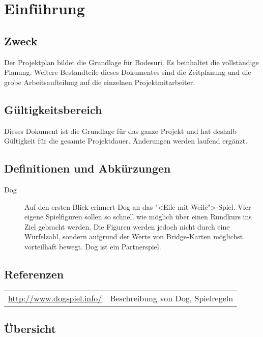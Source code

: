 \documentclass[12pt,halfparskip]{scrartcl}
\begin{document}


\section{Einführung}

\subsection{Zweck}

Der Projektplan bildet die Grundlage für Bodesuri. Es beinhaltet die vollständige Planung. Weitere Bestandteile dieses Dokumentes sind die Zeitplanung und die grobe Arbeitsaufteilung auf die einzelnen Projektmitarbeiter.

\subsection{Gültigkeitsbereich}

Dieses Dokument ist die Grundlage für das ganze Projekt und hat deshalb Gültigkeit für die gesamte Projektdauer. Änderungen werden laufend ergänzt.

\subsection{Definitionen und Abkürzungen}

\begin{description}
	\item[Dog] Auf den ersten Blick erinnert Dog an das "<Eile mit Weile">-Spiel. Vier eigene Spielfiguren sollen so schnell wie möglich über einen Rundkurs ins Ziel gebracht werden. Die Figuren werden jedoch nicht durch eine Würfelzahl, sondern aufgrund der Werte von Bridge-Karten möglichst vorteilhaft bewegt. Dog ist ein Partnerspiel.
\end{description}

\subsection{Referenzen}

\begin{tabular}{@{}ll@{}}
\url{http://www.dogspiel.info/} & Beschreibung von Dog, Spielregeln
\end{tabular}

\subsection{Übersicht}
\end{document}
